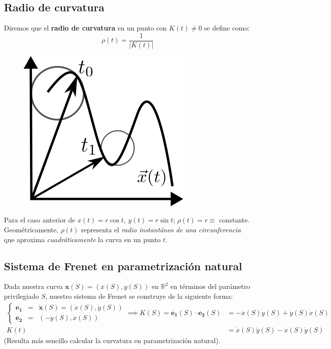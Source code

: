 \subsection{Radio de curvatura}
\begin{mybox}
    Diremos que el \textbf{radio de curvatura} en un punto con $K(t)\neq 0$ se define como:
    $$
    \boxed{\rho (t)=\frac{1}{|K(t)|}}
    $$
\end{mybox}
\begin{figure}
        \centering
        \includegraphics[scale=.4]{FOTOS/radio.png}
\end{figure}

Para el caso anterior de $x(t)=r\cos{t}, \  y(t)=r\sin{t}$; $\rho(t)=r\equiv$ constante. Geométricamente, $\rho(t)$ representa el \emph{radio instantáneo de una circunferencia} que aproxima \emph{cuadráticamente} la curva en un punto $t$.\\
\WFclear
\subsection{Sistema de Frenet en parametrización natural}

Dada nuestra curva $\mathbf{x}(S)=(x(S),y(S))$ en $\mathbb{R}^2$ en términos del parámetro privilegiado $S$, nuestro sistema de Frenet se construye de la siguiente forma:
\begin{equation*}
\begin{split}
    \left \{ \begin{array}{ccc}
      \mathbf{e_1}   &=&\dot{\mathbf{x}}(S)=(\dot{x}(S),\dot{y}(S))  \\
      \mathbf{e_2}   &=&(-\dot{y}(S),\dot{x}(S)) 
    \end{array} \right . \implies K(S)=\dot{\mathbf{e_1}}(S)\cdot \mathbf{e_2}(S)&=-\ddot{x}(S)\dot{y}(S)+\ddot{y}(S)\dot{x}(S)\\
                                                                     K(t)&=\dot{x}(S)\ddot{y}(S)-\ddot{x}(S)\dot{y}(S)
\end{split}
\end{equation*}
(Resulta más sencillo calcular la curvatura en parametrización natural).
